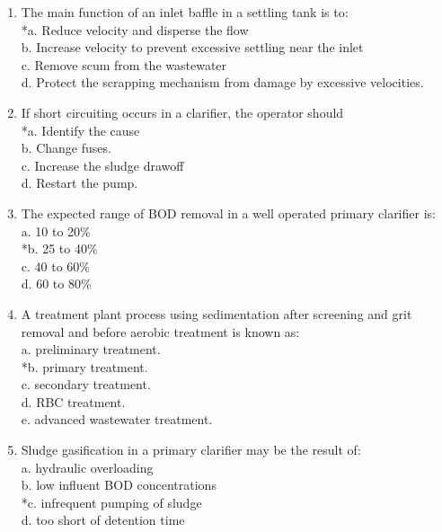 \begin{enumerate}
\item  The main function of an inlet baffle in a settling tank is to: \\

*a. Reduce velocity and disperse the flow \\
b. Increase velocity to prevent excessive settling near the inlet \\
c. Remove scum from the wastewater \\
d. Protect the scrapping mechanism from damage by excessive velocities. \\


\item  If short circuiting occurs in a clarifier, the operator should \\

*a. Identify the cause \\
b. Change fuses. \\
c. Increase the sludge drawoff \\
d. Restart the pump. \\


\item  The expected range of BOD removal in a well operated primary clarifier is: \\

a. 10 to 20\% \\
*b. 25 to 40\% \\
c. 40 to 60\% \\
d. 60 to 80\% \\


\item  A treatment plant process using sedimentation after screening and grit removal and before aerobic treatment is known as: \\

a. preliminary treatment. \\
*b. primary treatment. \\
c. secondary treatment. \\
d. RBC treatment. \\
e. advanced wastewater treatment. \\


\item  Sludge gasification in a primary clarifier may be the result of: \\

a. hydraulic overloading \\
b. low influent BOD concentrations \\
*c. infrequent pumping of sludge \\
d. too short of detention time \\



\end{enumerate}

